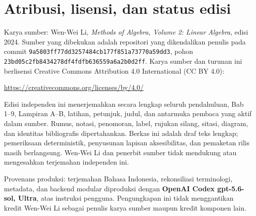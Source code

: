 \documentclass[
  colors=true,
  coverpage=coverpage-id.tex,
  fontsetup=font-setup-id.tex,
  titlesetup=titles-setup.tex
]{AJbook2}
\numberwithin{equation}{section}
\numberwithin{figure}{section}
\theoremstyle{plain}
\theoremstyle{nonumberplain}
\begin{document}
\frontmatter

\cleardoublepage
\thispagestyle{empty}
\section*{Atribusi, lisensi, dan status edisi}
Karya sumber: Wen-Wei Li, \emph{Methods of Algebra, Volume 2: Linear
Algebra}, edisi 2024. Sumber yang dibekukan adalah repositori yang
dikendalikan penulis pada commit
\texttt{9a5803ff77dd3257484cb177f851a73770a59dd3}, pohon
\texttt{23bd05c2fb8434278df4fdfb636559a6a2b0d2ff}.
Karya sumber dan turunan ini berlisensi Creative Commons Attribution
4.0 International (CC BY 4.0):
\begin{center}
  \small\url{https://creativecommons.org/licenses/by/4.0/}
\end{center}

Edisi independen ini menerjemahkan secara lengkap seluruh pendahuluan,
Bab 1--9, Lampiran A--B, latihan, petunjuk, judul, dan antarmuka pembaca
yang aktif dalam sumber. Rumus, notasi, penomoran, label, rujukan silang,
sitasi, diagram, dan identitas bibliografis dipertahankan. Berkas ini
adalah draf teks lengkap; pemeriksaan deterministik, penyusunan lapisan
aksesibilitas, dan pemaketan rilis masih berlangsung. Wen-Wei Li dan
penerbit sumber tidak mendukung atau mengesahkan terjemahan independen
ini.

\medskip
Provenans produksi: terjemahan Bahasa Indonesia, rekonsiliasi
terminologi, metadata, dan backend modular diproduksi dengan
\textbf{OpenAI Codex gpt-5.6-sol, Ultra}, atas instruksi pengguna.
Pengungkapan ini tidak menggantikan kredit Wen-Wei Li sebagai penulis
karya sumber maupun kredit komponen lain.

\mainmatter








\end{document}
